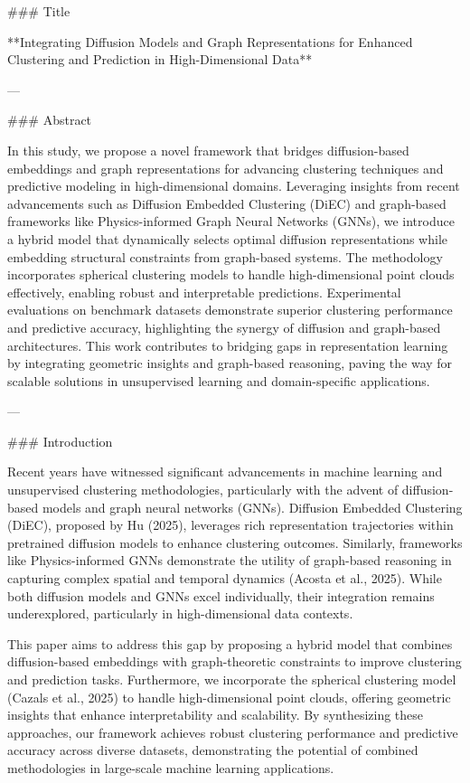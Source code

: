 ### Title

**Integrating Diffusion Models and Graph Representations for Enhanced Clustering and Prediction in High-Dimensional Data**

---

### Abstract

In this study, we propose a novel framework that bridges diffusion-based embeddings and graph representations for advancing clustering techniques and predictive modeling in high-dimensional domains. Leveraging insights from recent advancements such as Diffusion Embedded Clustering (DiEC) and graph-based frameworks like Physics-informed Graph Neural Networks (GNNs), we introduce a hybrid model that dynamically selects optimal diffusion representations while embedding structural constraints from graph-based systems. The methodology incorporates spherical clustering models to handle high-dimensional point clouds effectively, enabling robust and interpretable predictions. Experimental evaluations on benchmark datasets demonstrate superior clustering performance and predictive accuracy, highlighting the synergy of diffusion and graph-based architectures. This work contributes to bridging gaps in representation learning by integrating geometric insights and graph-based reasoning, paving the way for scalable solutions in unsupervised learning and domain-specific applications.

---

### Introduction

Recent years have witnessed significant advancements in machine learning and unsupervised clustering methodologies, particularly with the advent of diffusion-based models and graph neural networks (GNNs). Diffusion Embedded Clustering (DiEC), proposed by Hu (2025), leverages rich representation trajectories within pretrained diffusion models to enhance clustering outcomes. Similarly, frameworks like Physics-informed GNNs demonstrate the utility of graph-based reasoning in capturing complex spatial and temporal dynamics (Acosta et al., 2025). While both diffusion models and GNNs excel individually, their integration remains underexplored, particularly in high-dimensional data contexts.

This paper aims to address this gap by proposing a hybrid model that combines diffusion-based embeddings with graph-theoretic constraints to improve clustering and prediction tasks. Furthermore, we incorporate the spherical clustering model (Cazals et al., 2025) to handle high-dimensional point clouds, offering geometric insights that enhance interpretability and scalability. By synthesizing these approaches, our framework achieves robust clustering performance and predictive accuracy across diverse datasets, demonstrating the potential of combined methodologies in large-scale machine learning applications.


